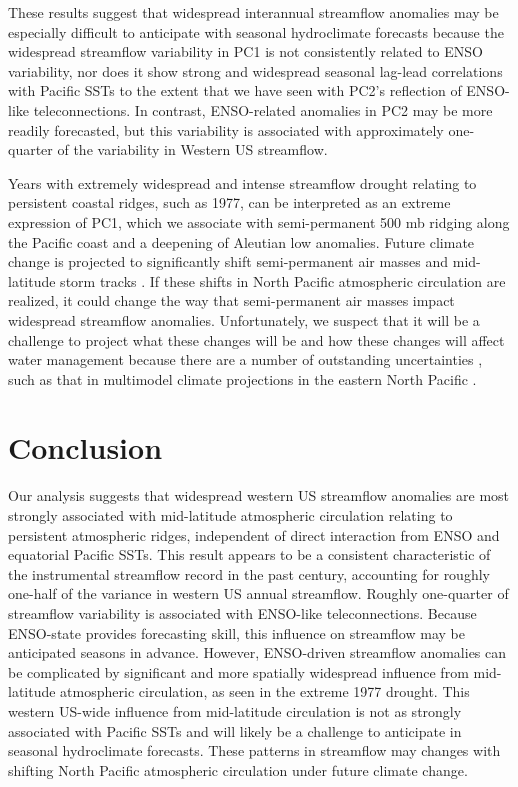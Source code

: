 \documentclass[final, double]{ua-thesis}
\begin{document}
These results suggest that widespread interannual streamflow anomalies may be especially difficult to anticipate with seasonal hydroclimate forecasts because the widespread streamflow variability in PC1 is not consistently related to ENSO variability, nor does it show strong and widespread seasonal lag-lead correlations with Pacific SSTs to the extent that we have seen with PC2's reflection of ENSO-like teleconnections. In contrast, ENSO-related anomalies in PC2 may be more readily forecasted, but this variability is associated with approximately one-quarter of the variability in Western US streamflow.

Years with extremely widespread and intense streamflow drought relating to persistent coastal ridges, such as 1977, can be interpreted as an extreme expression of PC1, which we associate with semi-permanent 500 mb ridging along the Pacific coast and a deepening of Aleutian low anomalies. Future climate change is projected to significantly shift semi-permanent air masses and mid-latitude storm tracks \citep[e.g., ][]{1yin_consistent_2005, 1lu_expansion_2007, 1scheff_twenty-first-century_2012, 1langenbrunner_patterns_2015, 1choi_uncertainty_2016}. If these shifts in North Pacific atmospheric circulation are realized, it could change the way that semi-permanent air masses impact widespread streamflow anomalies. Unfortunately, we suspect that it will be a challenge to project what these changes will be and how these changes will affect water management because there are a number of outstanding uncertainties \citep[e.g., ][]{1reclamation_bureau_of_reclamation_west-wide_2016}, such as that in multimodel climate projections in the eastern North Pacific \citep[e.g., ][]{1langenbrunner_patterns_2015, 1choi_uncertainty_2016}.

\section{Conclusion}

Our analysis suggests that widespread western US streamflow anomalies are most strongly associated with mid-latitude atmospheric circulation relating to persistent atmospheric ridges, independent of direct interaction from ENSO and equatorial Pacific SSTs. This result appears to be a consistent characteristic of the instrumental streamflow record in the past century, accounting for roughly one-half of the variance in western US annual streamflow. Roughly one-quarter of streamflow variability is associated with ENSO-like teleconnections. Because ENSO-state provides forecasting skill, this influence on streamflow may be anticipated seasons in advance. However, ENSO-driven streamflow anomalies can be complicated by significant and more spatially widespread influence from mid-latitude atmospheric circulation, as seen in the extreme 1977 drought. This western US-wide influence from mid-latitude circulation is not as strongly associated with Pacific SSTs and will likely be a challenge to anticipate in seasonal hydroclimate forecasts. These patterns in streamflow may changes with shifting North Pacific atmospheric circulation under future climate change.
\end{document}
